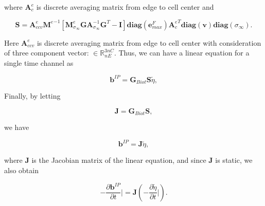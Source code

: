 \documentclass[extra,mreferee]{gji}
\newcommand{\siginf}{\sigma_\infty}
\newcommand{\Ace}{{\mathbf A_c^e}}
\newcommand{\diag}{\mathbf{diag}}
\newcommand{\M}{{\mathbf M}}
\newcommand{\MeSigInf}{{\M^e_{\sigma_\infty}}}
\newcommand{\Me}{{\M^e}}
\newcommand {\db}  { {\mathbf{b} } }
\newcommand {\de}  { {\mathbf{e} } }
\newcommand{\vol}{\mathbf{v}}
\newcommand{\A}{\mathbf{A}}
\newcommand{\Gbiot}{\mathbf{G}_{Biot}}
\newcommand{\peta}{\tilde{\eta}}
\begin{document}
where $\mathbf{A}^{e}_{c}$ is discrete averaging matrix from edge to cell center and 
\begin{linenomath*}
\begin{equation}
  \mathbf{S} = \mathbf{A}^{e}_{ccv}\Me^{-1}[\MeSigInf \mathbf{G} \A_{\siginf}^{-1}\mathbf{G}^T  - \mathbf{I}] \diag(\de^{F}_{max})\Ace^T\diag(\vol)\diag(\siginf).
\end{equation}
\end{linenomath*}
Here $\mathbf{A}^{e}_{ccv}$ is discrete averaging matrix from edge to cell center with consideration of three component vector: $\in \mathbb{R}^{3nC}_{nE}$. 
Thus, we can have a linear equation for a single time channel as
\begin{linenomath*}
\begin{equation*}
  \db^{IP} = \Gbiot \mathbf{S} \peta,
\end{equation*}
\end{linenomath*}
Finally, by letting
\begin{linenomath*}
\begin{equation}
  \mathbf{J} = \Gbiot\mathbf{S},
  \label{eq: Sense}
\end{equation}
\end{linenomath*}
we have
\begin{linenomath*}
\begin{equation}
  \db^{IP} = \mathbf{J}\peta,
  \label{eq: bIP_linear}
\end{equation}
\end{linenomath*}
where $\mathbf{J}$ is the Jacobian matrix of the linear equation, and since $\mathbf{J}$ is static, we also obtain
\begin{linenomath*}
\begin{equation}
  -\frac{\partial\db^{IP}}{\partial t}\Big| = \mathbf{J}(-\frac{\partial \peta}{\partial t}\Big|).
  \label{eq: dbIPdt_linear}
\end{equation}
\end{linenomath*}
\end{document}
